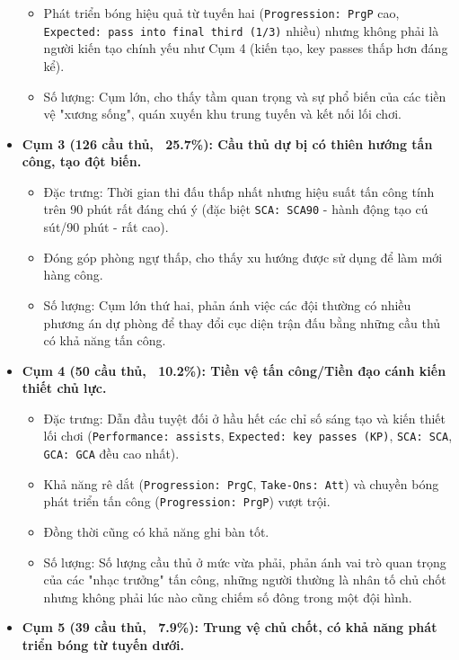 \documentclass[12pt, a4paper]{report}
\begin{document}
\begin{itemize}
\begin{itemize}
        \item Phát triển bóng hiệu quả từ tuyến hai (\texttt{Progression: PrgP} cao, \texttt{Expected: pass into final third (1/3)} nhiều) nhưng không phải là người kiến tạo chính yếu như Cụm 4 (kiến tạo, key passes thấp hơn đáng kể).
        \item Số lượng: Cụm lớn, cho thấy tầm quan trọng và sự phổ biến của các tiền vệ "xương sống", quán xuyến khu trung tuyến và kết nối lối chơi.
    \end{itemize}
    \item \textbf{Cụm 3 (126 cầu thủ, ~25.7\%): Cầu thủ dự bị có thiên hướng tấn công, tạo đột biến.}
    \begin{itemize}
        \item Đặc trưng: Thời gian thi đấu thấp nhất nhưng hiệu suất tấn công tính trên 90 phút rất đáng chú ý (đặc biệt \texttt{SCA: SCA90} - hành động tạo cú sút/90 phút - rất cao).
        \item Đóng góp phòng ngự thấp, cho thấy xu hướng được sử dụng để làm mới hàng công.
        \item Số lượng: Cụm lớn thứ hai, phản ánh việc các đội thường có nhiều phương án dự phòng để thay đổi cục diện trận đấu bằng những cầu thủ có khả năng tấn công.
    \end{itemize}
    \item \textbf{Cụm 4 (50 cầu thủ, ~10.2\%): Tiền vệ tấn công/Tiền đạo cánh kiến thiết chủ lực.}
    \begin{itemize}
        \item Đặc trưng: Dẫn đầu tuyệt đối ở hầu hết các chỉ số sáng tạo và kiến thiết lối chơi (\texttt{Performance: assists}, \texttt{Expected: key passes (KP)}, \texttt{SCA: SCA}, \texttt{GCA: GCA} đều cao nhất).
        \item Khả năng rê dắt (\texttt{Progression: PrgC}, \texttt{Take-Ons: Att}) và chuyền bóng phát triển tấn công (\texttt{Progression: PrgP}) vượt trội.
        \item Đồng thời cũng có khả năng ghi bàn tốt.
        \item Số lượng: Số lượng cầu thủ ở mức vừa phải, phản ánh vai trò quan trọng của các "nhạc trưởng" tấn công, những người thường là nhân tố chủ chốt nhưng không phải lúc nào cũng chiếm số đông trong một đội hình.
    \end{itemize}
    \item \textbf{Cụm 5 (39 cầu thủ, ~7.9\%): Trung vệ chủ chốt, có khả năng phát triển bóng từ tuyến dưới.}
    \begin{itemize}

\end{itemize}
\end{itemize}
\end{document}
